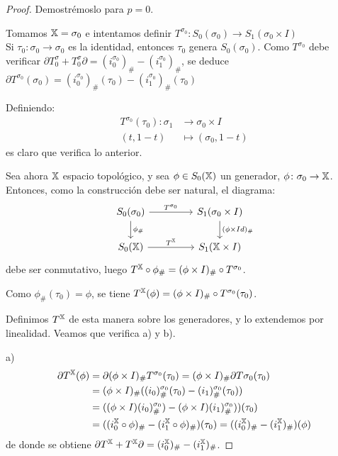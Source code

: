 \begin{proof}
  Demostrémoslo para $p = 0$.

  Tomamos ${\mathbb X} = \sigma_0$ e intentamos definir $T^{\sigma_0} \colon S_0(\sigma_0) \to S_1(\sigma_0 \times I)$ \\
  Si $\tau_0 \colon \sigma_0 \to \sigma_0$ es la identidad, entonces $\tau_0$ genera $S_0(\sigma_0)$. Como $T^{\sigma_0}$
  debe verificar $\partial T^\sigma_0 + T^\sigma_0 \partial = (i_0^{\sigma_0})_\# - (i_1^{\sigma_0})_\#$, se deduce
  $\partial T^{\sigma_0}(\sigma_0) = (i_0^{\sigma_0})_\# (\tau_0) - (i_1^{\sigma_0})_\# (\tau_0)$

  Definiendo:
  \begin{align*}
    T^{\sigma_0}(\tau_0) \colon \sigma_1 &\to \sigma_0 \times I \\
                       (t, 1-t) &\mapsto (\sigma_0, 1-t)
  \end{align*}
  es claro que verifica lo anterior.

  Sea ahora ${\mathbb X}$ espacio topológico, y sea $\phi \in S_0({\mathbb X})$ un generador, $\phi \colon \sigma_0 \to {\mathbb X}$.
  Entonces, como la construcción debe ser natural, el diagrama:
  \[
  \begin{tikzcd}
    S_0(\sigma_0) \arrow{r}{T^{\sigma_0}} \arrow{d}{\phi_\#} & [2em] S_1(\sigma_0 \times I) \arrow{d}{(\phi \times Id)_\#} \\
    \SX{0} \arrow{r}{T^\X}                 & S_1(\X \times I)
  \end{tikzcd}
  \]
  debe ser conmutativo, luego $T^{\mathbb X} \circ \phi_\# = (\phi \times I)_\# \circ T^{\sigma_0}$.

  Como $\phi_\#(\tau_0) = \phi$, se tiene $T^{\mathbb X}(\phi) = (\phi \times I)_\# \circ T^{\sigma_0}(\tau_0)$.

  Definimos $T^{\mathbb X}$ de esta manera sobre los generadores, y lo extendemos por linealidad. Veamos que verifica a) y b).

  a)
  \begin{align*}
    \partial T^{\mathbb X}(\phi) &= \partial(\phi \times I)_\# T^{\sigma_0}(\tau_0) = (\phi \times I)_\# \partial T{ \sigma_0}(\tau_0) \\
                        &= (\phi \times I)_\# ((i_0)_\#^{\sigma_0}(\tau_0) - (i_1)_\#^{\sigma_0}(\tau_0)) \\
                        &= ((\phi \times I) (i_0)_\#^{\sigma_0}) - (\phi \times I) (i_1)_\#^{\sigma_0}))(\tau_0) \\
                        &= ((i_0^{\mathbb X} \circ \phi)_\# - (i_1^{\mathbb X} \circ \phi)_\#) (\tau_0) = ((i_0^{\mathbb X})_\# - (i_1^{\mathbb X})_\#)(\phi)
  \end{align*}
  de donde se obtiene $\partial T^{\mathbb X} + T^{\mathbb X} \partial = (i_0^{\mathbb X})_\# - (i_1^{\mathbb X})_\#$.


\end{proof}

